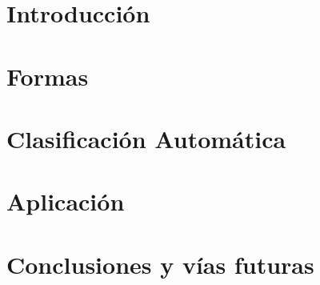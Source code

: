 \documentclass[a4paper,11pt]{book}
\begin{document}


\frontmatter
{}


\tableofcontents
\listoftodos

\mainmatter
%
\chapter{Introducción}
\label{ch0}


\chapter{Formas}
\label{ch1}

%



\chapter{Clasificación Automática}
\label{ch2}





\chapter{Aplicación}
\label{ch3}


\chapter{Conclusiones y vías futuras}
\label{ch4}




\end{document}

